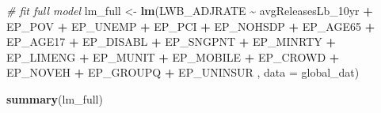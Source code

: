 \documentclass[
  12pt,
]{article}
\newenvironment{Shaded}{\begin{snugshade}}{\end{snugshade}}
\newcommand{\AttributeTok}[1]{\textcolor[rgb]{0.13,0.29,0.53}{#1}}
\newcommand{\CommentTok}[1]{\textcolor[rgb]{0.56,0.35,0.01}{\textit{#1}}}
\newcommand{\FunctionTok}[1]{\textcolor[rgb]{0.13,0.29,0.53}{\textbf{#1}}}
\newcommand{\NormalTok}[1]{#1}
\newcommand{\OtherTok}[1]{\textcolor[rgb]{0.56,0.35,0.01}{#1}}
\newcommand{\SpecialCharTok}[1]{\textcolor[rgb]{0.81,0.36,0.00}{\textbf{#1}}}
\begin{document}
\begin{Shaded}
\begin{Highlighting}[]
\CommentTok{\# fit full model}
\NormalTok{lm\_full }\OtherTok{\textless{}{-}} \FunctionTok{lm}\NormalTok{(LWB\_ADJRATE }\SpecialCharTok{\textasciitilde{}}\NormalTok{ avgReleasesLb\_10yr }\SpecialCharTok{+}\NormalTok{ EP\_POV }\SpecialCharTok{+}\NormalTok{ EP\_UNEMP }\SpecialCharTok{+}\NormalTok{ EP\_PCI }\SpecialCharTok{+}\NormalTok{ EP\_NOHSDP }\SpecialCharTok{+}\NormalTok{ EP\_AGE65 }\SpecialCharTok{+}\NormalTok{ EP\_AGE17 }\SpecialCharTok{+}\NormalTok{ EP\_DISABL}
                                               \SpecialCharTok{+}\NormalTok{ EP\_SNGPNT }\SpecialCharTok{+}\NormalTok{ EP\_MINRTY }\SpecialCharTok{+}\NormalTok{ EP\_LIMENG }\SpecialCharTok{+}\NormalTok{ EP\_MUNIT }\SpecialCharTok{+}\NormalTok{ EP\_MOBILE }\SpecialCharTok{+}\NormalTok{ EP\_CROWD}
                                               \SpecialCharTok{+}\NormalTok{ EP\_NOVEH }\SpecialCharTok{+}\NormalTok{ EP\_GROUPQ }\SpecialCharTok{+}\NormalTok{ EP\_UNINSUR}
\NormalTok{              , }\AttributeTok{data =}\NormalTok{ global\_dat)}

\FunctionTok{summary}\NormalTok{(lm\_full)}
\end{Highlighting}
\end{Shaded}
\end{document}
